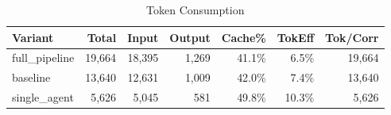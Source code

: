 \begin{table}[htbp]
\centering
\caption{Token Consumption}
\label{tab:tokens}
\begin{tabular}{l rrrr rr}
\toprule
Variant & Total & Input & Output & Cache\% & TokEff & Tok/Corr \\
\midrule
  full\_pipeline & 19,664 & 18,395 & 1,269 & 41.1\% & 6.5\% & 19,664 \\
  baseline & 13,640 & 12,631 & 1,009 & 42.0\% & 7.4\% & 13,640 \\
  single\_agent & 5,626 & 5,045 & 581 & 49.8\% & 10.3\% & 5,626 \\
\bottomrule
\end{tabular}
\end{table}
